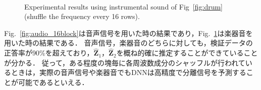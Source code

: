 \begin{figure}[!t]
  \centering
  \\
  \caption{Experimental results using instrumental sound of Fig~\ref{fig:drum} (shuffle the frequency every 16 rows).}
  \label{fig:Drum_16block}
\end{figure}

Fig.~\ref{fig:audio_16block}は音声信号を用いた時の結果であり，Fig.~\ref{fig:Drum_16block}は楽器音を用いた時の結果である．
音声信号，楽器音のどちらに対しても，検証データの正答率が90\%を超えており，$\hat{\bm{Z}}_1$，$\hat{\bm{Z}}_2$を概ね的確に推定することができていることが分かる．
従って，ある程度の塊毎に各周波数成分のシャッフルが行われているときは，実際の音声信号や楽器音でもDNNは高精度で分離信号を予測することが可能であるといえる．

